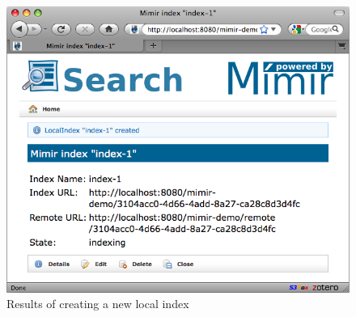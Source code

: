 \begin{figure}[htb!]
\begin{center}
\includegraphics[scale=0.5]{img/local-index-created}
\end{center}
\caption{Results of creating a new local index}
\label{fig:local-index-created}
\end{figure}
%

